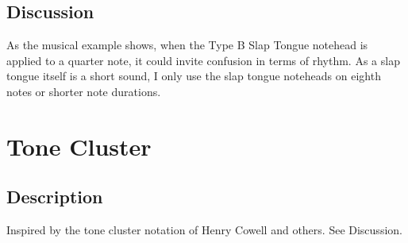 \documentclass[11pt, oneside]{book}   	%
\begin{document}
\subsection{Discussion}
As the musical example shows, when the Type B Slap Tongue notehead is applied to a quarter note, it could invite confusion in terms of rhythm. As a slap tongue itself is a short sound, I only use the slap tongue noteheads on eighth notes or shorter note durations. 




\section {Tone Cluster}
\hfill
\subsection{Description}
Inspired by the tone cluster notation of Henry Cowell and others. See Discussion.
\end{document}
